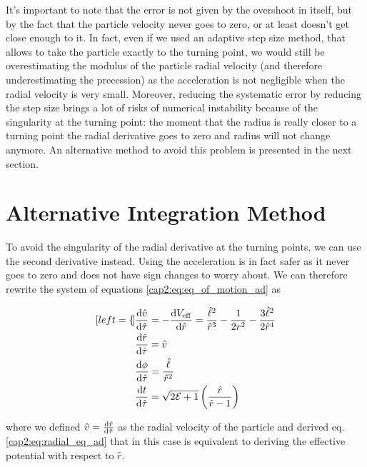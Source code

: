 It's important to note that the error is not given by the overshoot in itself,
but by the fact that the particle velocity never goes to zero, or at least
doesn't get close enough to it.
In fact, even if we used an adaptive step size method, that allows to take the
particle exactly to the turning point, we would still be overestimating the
modulus of the particle radial velocity (and therefore underestimating the
precession) as the acceleration is not negligible when the radial velocity is
very small.
Moreover, reducing the systematic error by reducing the step size brings a lot
of risks of numerical instability because of the singularity at the turning
point: the moment that the radius is really closer to a turning point the radial
derivative goes to zero and radius will not change anymore.
An alternative method to avoid this problem is presented in the next section.


\section{Alternative Integration Method}

To avoid the singularity of the radial derivative at the turning points, we can
use the second derivative instead.
Using the acceleration is in fact safer as it never goes to zero and does not
have sign changes to worry about.
We can therefore rewrite the system of equations \ref{cap2:eq:eq_of_motion_ad}
as

\begin{subequations}
    \begin{align}[left = {\empheqlbrace}]
        &\dv{\hat v}{\hat \tau} = - \dv{V_{\rm eff}}{\hat r} 
        = \frac{\hat \ell^2}{\hat r^3} - \frac{1}{2 r^2}
        - \frac{3 \hat \ell^2}{2 \hat r^4} \label{cap2:eq:acc_eq_ad} \\
        &\dv{\hat r}{\hat \tau} = \hat v \\
        &\dv{\phi}{\hat \tau} = \frac{\hat \ell}{\hat r^2} \\
        &\dv{t}{\hat \tau} = \sqrt{2 \mathcal E + 1}
        \left(\frac{\hat r}{\hat r - 1}\right)
        \label{cap2:eq:t_ad_v2}
    \end{align}
    \label{cap2:eq:eq_of_motion_v2}
\end{subequations}

where we defined $\hat v = \dv{\hat r}{\hat \tau}$ as the radial velocity of the
particle and derived eq. \ref{cap2:eq:radial_eq_ad} that in this case is
equivalent to deriving the effective potential with respect to $\hat r$.

